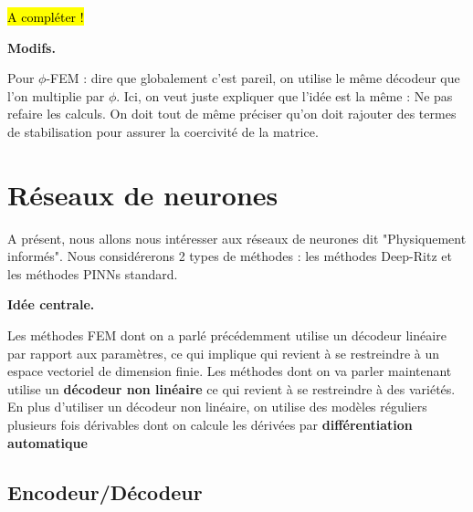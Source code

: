 \documentclass[french]{article}
\begin{document}
	\hl{A compléter !}
	
	\begin{tcolorbox}[
		colback=white, %
		colframe=red!70!black, %
		arc=2mm, %
		boxrule=1pt, %
		breakable, enhanced jigsaw
		]
		\textcolor{red!70!black}{\textbf{Modifs.} \\}
		
		Pour $\phi$-FEM : dire que globalement c'est pareil, on utilise le même décodeur que l'on multiplie par $\phi$. Ici, on veut juste expliquer que l'idée est la même : Ne pas refaire les calculs. On doit tout de même préciser qu'on doit rajouter des termes de stabilisation pour assurer la coercivité de la matrice.
	\end{tcolorbox}

	\section{Réseaux de neurones}

	A présent, nous allons nous intéresser aux réseaux de neurones dit "Physiquement informés". Nous considérerons 2 types de méthodes : les méthodes Deep-Ritz et les méthodes PINNs standard.
	
	\begin{tcolorbox}[
		colback=white, %
		colframe=black!70!black, %
		arc=2mm, %
		boxrule=1pt, %
		breakable, enhanced jigsaw
		]
		\textcolor{black!70!black}{\textbf{Idée centrale.} \\}
		
		Les méthodes FEM dont on a parlé précédemment utilise un décodeur linéaire par rapport aux paramètres, ce qui implique qui revient à se restreindre à un espace vectoriel de dimension finie. Les méthodes dont on va parler maintenant utilise un \textbf{décodeur non linéaire} ce qui revient à se restreindre à des variétés. En plus d'utiliser un décodeur non linéaire, on utilise des modèles réguliers plusieurs fois dérivables dont on calcule les dérivées par \textbf{différentiation automatique}
	\end{tcolorbox}

	\subsection{Encodeur/Décodeur}
	
\end{document}

